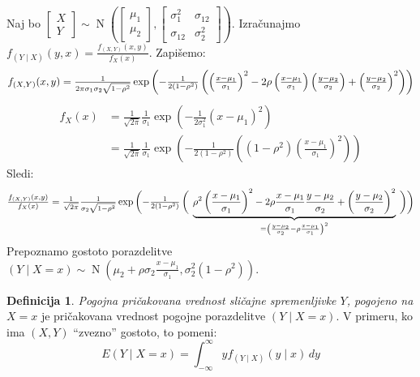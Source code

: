 \documentclass[12pt]{book}
\theoremstyle{definition}
\newtheorem{definicija}{Definicija}
\theoremstyle{plain}
\theoremstyle{plain}
\theoremstyle{plain}
\theoremstyle{plain}
\theoremstyle{remark}
\begin{document}
\begin{zgled} 
    Naj bo $\begin{bmatrix}X \\ Y \end{bmatrix} \sim \operatorname{N}\left(\begin{bmatrix} \mu_1 \\\mu_2 \end{bmatrix}, \begin{bmatrix} \sigma_1^2 & \sigma_{12} \\ \sigma_{12} & \sigma_2^2\end{bmatrix}\right)$. \hspace{-2.82718pt}Izračunajmo $f_{(Y \mid X)}(y, x)=\frac{f_{(X, Y)}(x, y)}{f_X(x)}$. Zapišemo:
    $$
    \scalebox{1}{$f_{(X, Y)}(x, y)=\frac{1}{2 \pi \sigma_1 \sigma_2 \sqrt{1-\rho^2}} \exp \left(-\frac{1}{2\left(1-\rho^2\right)}\left(\left(\frac{x-\mu_1}{\sigma_1}\right)^2-2 \rho\left(\frac{x-\mu_1}{\sigma_1}\right)\left(\frac{y-\mu_2}{\sigma_2}\right)+\left(\frac{y-\mu_2}{\sigma_2}\right)^2\right)\right)$}
    $$
    $$
    \begin{aligned}
        f_X(x)&=\frac{1}{\sqrt{2 \pi}} \frac{1}{\sigma_1} \exp\left(-\frac{1}{2 \sigma_1^2}\left(x-\mu_1\right)^2\right) \\
        &=\frac{1}{\sqrt{2 \pi}} \frac{1}{\sigma_1} \exp\left(-\frac{1}{2\left(1-\rho^2\right)}\left(\left(1-\rho^2\right)\left(\frac{x-\mu_1}{\sigma_1}\right)^2\right)\right)    
    \end{aligned}
    $$
    Sledi:
    $$
    \scalebox{0.9}{$\frac{f_{(X, Y)}(x, y)}{f_X(x)}=\frac{1}{\sqrt{2 \pi}} \frac{1}{\sigma_2 \sqrt{1-\rho^2}} \exp\left({-\frac{1}{2\left(1-\rho^2\right)}}\left( \vphantom{\rho^2\left(\frac{x-\mu_1}{\sigma_1}\right)^2}\right. \right. \underbrace{\rho^2\left(\frac{x-\mu_1}{\sigma_1}\right)^2-2 \rho \frac{x-\mu_1}{\sigma_1} \frac{y-\mu_2}{\sigma_2}+\left(\frac{y-\mu_2}{\sigma_2}\right)^2}_{=\left(\frac{y-\mu_2}{\sigma_2}-\rho \frac{x-\mu_1}{\sigma_1}\right)^2} \left. \left. \vphantom{\rho^2\left(\frac{x-\mu_1}{\sigma_1}\right)^2} \right)\right)$}
    $$
    Prepoznamo gostoto porazdelitve $ (Y \mid X=x) \sim \operatorname{N}\left(\mu_2+\rho \sigma_2 \frac{x-\mu_1}{\sigma_1}, \sigma_2^2\left(1-\rho^2\right)\right)$.
\end{zgled}

\begin{definicija}
    \emph{Pogojna pričakovana vrednost sličajne spremenljivke $Y$, pogojeno na $X=x$} je pričakovana vrednost pogojne porazdelitve $(Y \mid X=x)$. V primeru, ko ima $(X,Y)$ “zvezno” gostoto, to pomeni:
    $$
    E(Y \mid X=x)=\int_{-\infty}^{\infty} y f_{(Y \mid X)}(y \mid x)\, d y
    $$
\end{definicija}
\end{document}
